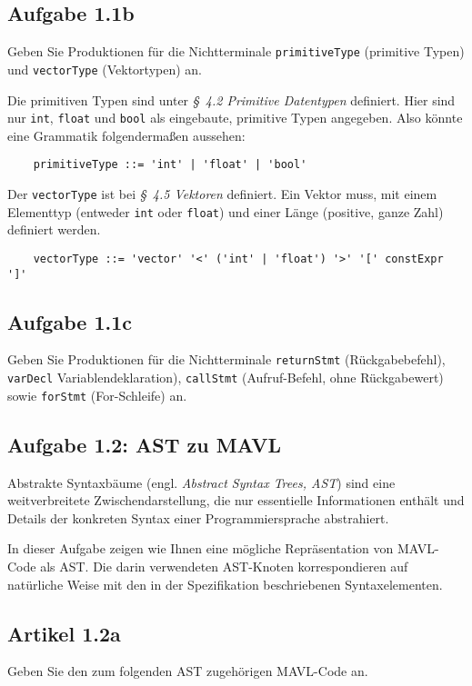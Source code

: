 \documentclass[
  ngerman,
  DIV=14
]{scrartcl}
\begin{document}
\subsection*{Aufgabe 1.1b}

Geben Sie Produktionen für die Nichtterminale \verb|primitiveType| (primitive Typen) und \verb|vectorType| (Vektortypen) an.

\bigskip\noindent
Die primitiven Typen sind unter \emph{§~4.2 Primitive Datentypen} definiert. Hier sind nur \texttt{int}, \texttt{float} und \texttt{bool} als eingebaute, primitive Typen angegeben. Also könnte eine Grammatik folgendermaßen aussehen:
\begin{verbatim}
    primitiveType ::= 'int' | 'float' | 'bool'
\end{verbatim}
Der \texttt{vectorType} ist bei \emph{§~4.5 Vektoren} definiert. Ein Vektor muss, mit einem Elementtyp (entweder \texttt{int} oder \texttt{float}) und einer Länge (positive, ganze Zahl) definiert werden.
\begin{verbatim}
    vectorType ::= 'vector' '<' ('int' | 'float') '>' '[' constExpr ']'
\end{verbatim}

\subsection*{Aufgabe 1.1c}

Geben Sie Produktionen für die Nichtterminale \texttt{returnStmt} (Rückgabebefehl), \texttt{varDecl} Variablendeklaration), \texttt{callStmt} (Aufruf-Befehl, ohne Rückgabewert) sowie \texttt{forStmt} (For-Schleife) an.




\subsection*{Aufgabe 1.2: AST zu MAVL}
Abstrakte Syntaxbäume (engl. \emph{Abstract Syntax Trees, AST}) sind eine weitverbreitete Zwischendarstellung, die nur essentielle Informationen enthält und Details der konkreten Syntax einer Programmiersprache abstrahiert.

\medskip\noindent
In dieser Aufgabe zeigen wie Ihnen eine mögliche Repräsentation von MAVL-Code als AST. Die darin verwendeten AST-Knoten korrespondieren auf natürliche Weise mit den in der Spezifikation beschriebenen Syntaxelementen. 

\subsection*{Artikel 1.2a}
Geben Sie den zum folgenden AST zugehörigen MAVL-Code an.  
\end{document}
